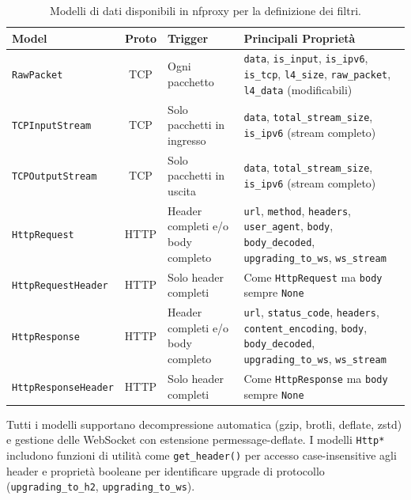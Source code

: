 \renewcommand{\arraystretch}{1.3}
\begin{table}[H]
    \centering
    \footnotesize
    \begin{tabular}{|l|c|p{3.5cm}|p{6cm}|}
        \hline
        \textbf{Model} & \textbf{Proto} & \textbf{Trigger} & \textbf{Principali Proprietà} \\
        \hline
        \texttt{RawPacket} & TCP & Ogni pacchetto &
        \texttt{data}, \texttt{is\_input}, \texttt{is\_ipv6}, \texttt{is\_tcp}, \texttt{l4\_size}, \texttt{raw\_packet}, \texttt{l4\_data} (modificabili) \\
        \hline
        \texttt{TCPInputStream} & TCP & Solo pacchetti in ingresso &
        \texttt{data}, \texttt{total\_stream\_size}, \texttt{is\_ipv6} (stream completo) \\
        \hline
        \texttt{TCPOutputStream} & TCP & Solo pacchetti in uscita &
        \texttt{data}, \texttt{total\_stream\_size}, \texttt{is\_ipv6} (stream completo) \\
        \hline
        \texttt{HttpRequest} & HTTP & Header completi e/o body completo &
        \texttt{url}, \texttt{method}, \texttt{headers}, \texttt{user\_agent}, \texttt{body}, \texttt{body\_decoded}, \texttt{upgrading\_to\_ws}, \texttt{ws\_stream} \\
        \hline
        \texttt{HttpRequestHeader} & HTTP & Solo header completi &
        Come \texttt{HttpRequest} ma \texttt{body} sempre \texttt{None} \\
        \hline
        \texttt{HttpResponse} & HTTP & Header completi e/o body completo &
        \texttt{url}, \texttt{status\_code}, \texttt{headers}, \texttt{content\_encoding}, \texttt{body}, \texttt{body\_decoded}, \texttt{upgrading\_to\_ws}, \texttt{ws\_stream} \\
        \hline
        \texttt{HttpResponseHeader} & HTTP & Solo header completi &
        Come \texttt{HttpResponse} ma \texttt{body} sempre \texttt{None} \\
        \hline
    \end{tabular}
    \caption{Modelli di dati disponibili in nfproxy per la definizione dei filtri.}\label{tab:nfproxy_datahandlers}
\end{table}
\renewcommand{\arraystretch}{1}

Tutti i modelli supportano decompressione automatica (gzip, brotli, deflate, zstd) e gestione delle WebSocket con estensione permessage-deflate. I modelli \texttt{Http*} includono funzioni di utilità come \texttt{get\_header()} per accesso case-insensitive agli header e proprietà booleane per identificare upgrade di protocollo (\texttt{upgrading\_to\_h2}, \texttt{upgrading\_to\_ws}).

